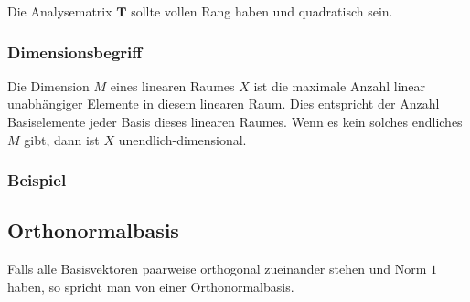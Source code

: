 \documentclass[11pt]{article}
\begin{document}
Die Analysematrix $\mathbf{T}$ sollte vollen Rang haben und quadratisch sein.

\vspace*{-0.5cm}
\subsubsection*{Dimensionsbegriff}
\vspace*{-0.5cm}
Die Dimension $M$ eines linearen Raumes $X$ ist die maximale Anzahl linear unabhängiger Elemente in diesem linearen Raum. Dies entspricht der Anzahl Basiselemente jeder Basis dieses linearen Raumes. Wenn es kein solches endliches $M$ gibt, dann ist $X$ unendlich-dimensional.

\vspace*{-0.5cm}
\subsubsection*{Beispiel}
\vspace*{-0.5cm}

\pagebreak

\subsection*{Orthonormalbasis}
\vspace*{-0.5cm}
Falls alle Basisvektoren paarweise orthogonal zueinander stehen und Norm $1$ haben, so spricht man von einer Orthonormalbasis.

\vspace*{-0.5cm}
\end{document}
